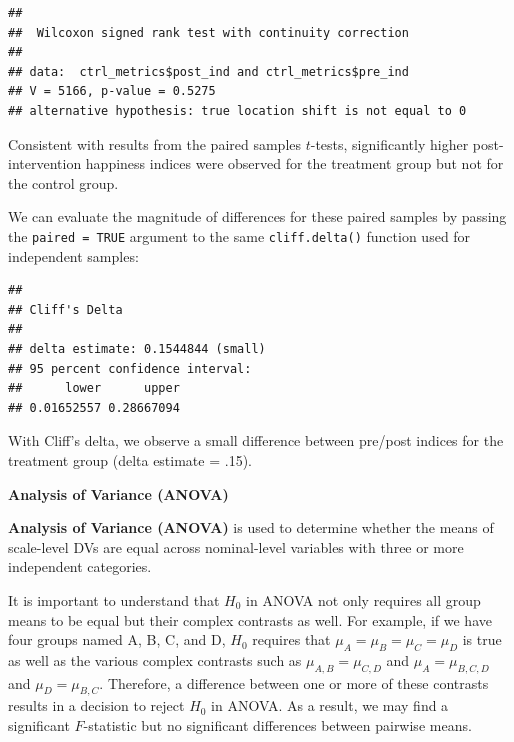 \documentclass[
]{book}
\newenvironment{Shaded}{\begin{snugshade}}{\end{snugshade}}
\newcommand{\AttributeTok}[1]{\textcolor[rgb]{0.77,0.63,0.00}{#1}}
\newcommand{\CommentTok}[1]{\textcolor[rgb]{0.56,0.35,0.01}{\textit{#1}}}
\newcommand{\ConstantTok}[1]{\textcolor[rgb]{0.00,0.00,0.00}{#1}}
\newcommand{\FunctionTok}[1]{\textcolor[rgb]{0.00,0.00,0.00}{#1}}
\newcommand{\NormalTok}[1]{#1}
\newcommand{\SpecialCharTok}[1]{\textcolor[rgb]{0.00,0.00,0.00}{#1}}
\begin{document}
\begin{verbatim}
## 
##  Wilcoxon signed rank test with continuity correction
## 
## data:  ctrl_metrics$post_ind and ctrl_metrics$pre_ind
## V = 5166, p-value = 0.5275
## alternative hypothesis: true location shift is not equal to 0
\end{verbatim}

Consistent with results from the paired samples \(t\)-tests, significantly higher post-intervention happiness indices were observed for the treatment group but not for the control group.

We can evaluate the magnitude of differences for these paired samples by passing the \texttt{paired\ =\ TRUE} argument to the same \texttt{cliff.delta()} function used for independent samples:

\begin{Shaded}
\end{Shaded}

\begin{verbatim}
## 
## Cliff's Delta
## 
## delta estimate: 0.1544844 (small)
## 95 percent confidence interval:
##      lower      upper 
## 0.01652557 0.28667094
\end{verbatim}

With Cliff's delta, we observe a small difference between pre/post indices for the treatment group (delta estimate = .15).

\textbf{Analysis of Variance (ANOVA)}

\textbf{Analysis of Variance (ANOVA)} is used to determine whether the means of scale-level DVs are equal across nominal-level variables with three or more independent categories.

It is important to understand that \(H_0\) in ANOVA not only requires all group means to be equal but their complex contrasts as well. For example, if we have four groups named A, B, C, and D, \(H_0\) requires that \(\mu_A = \mu_B = \mu_C = \mu_D\) is true as well as the various complex contrasts such as \(\mu_{A,B} = \mu_{C,D}\) and \(\mu_A = \mu_{B,C,D}\) and \(\mu_D = \mu_{B,C}\). Therefore, a difference between one or more of these contrasts results in a decision to reject \(H_0\) in ANOVA. As a result, we may find a significant \(F\)-statistic but no significant differences between pairwise means.
\end{document}
